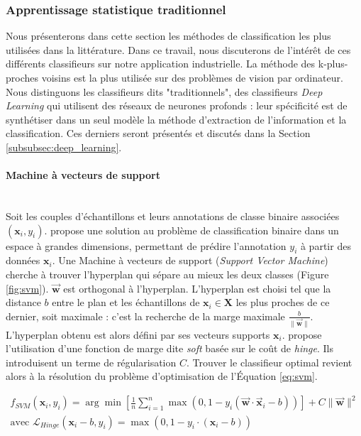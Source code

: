 \subsubsection{Apprentissage statistique traditionnel}
Nous présenterons dans cette section les méthodes de classification les plus utilisées dans la littérature.
Dans ce travail, nous discuterons de l'intérêt de ces différents classifieurs sur notre application industrielle.
La méthode des k-plus-proches voisins est la plus utilisée sur des problèmes de vision par ordinateur.
Nous distinguons les classifieurs dits "traditionnels", des classifieurs \textit{Deep Learning} qui utilisent des réseaux de neurones profonds : leur spécificité est de synthétiser dans un seul modèle la méthode d'extraction de l'information et la classification.
Ces derniers seront présentés et discutés dans la Section \ref{subsubsec:deep_learning}.

\paragraph{Machine à vecteurs de support}\mbox{\label{parag:svm}} \\
Soit les couples d'échantillons et leurs annotations de classe binaire associées $(\mathbf{x}_i, y_i)$.
\cite{vapnik_patterns_1963} propose une solution au problème de classification binaire dans un espace à grandes dimensions, permettant de prédire l'annotation $y_i$ à partir des données $\mathbf{x}_i$.
Une Machine à vecteurs de support (\textit{Support Vector Machine}) cherche à trouver l'hyperplan qui sépare au mieux les deux classes (Figure \ref{fig:svm}). $\vec{\mathbf{w}}$  est orthogonal à l'hyperplan.
L'hyperplan est choisi tel que la distance $b$ entre le plan et les échantillons de $\mathbf{x}_i \in \mathbf{X}$ les plus proches de ce dernier, soit maximale : c'est la recherche de la marge maximale $\frac{b}{\|\vec{\mathbf{w}}\|}$.
L'hyperplan obtenu est alors défini par ses vecteurs supports $\mathbf{x}_i$.
\cite{cortes_supportvector_1995, vapnik_support_1997} propose l'utilisation d'une fonction de marge dite \textit{soft} basée sur le coût de \textit{hinge}.
Ils introduisent un terme de régularisation $C$. Trouver le classifieur optimal revient alors à la résolution du problème d'optimisation de l'Équation \ref{eq:svm}.

\begin{equation} \label{eq:svm}
\begin{split}
f_{SVM}(\mathbf{x}_i, y_i) = \arg \min \left[\frac{1}{n} \sum_{i=1}^{n} \max \left(0, 1-y_{i}\left(\vec{\mathbf{w}} \cdot \vec{\mathbf{x}}_{i}-b\right)\right)\right]+ C \|\vec{\mathbf{w}}\|^{2}
\\
\text{avec } \mathcal{L}_{Hinge}(\mathbf{x}_i-b, y_i) = \max (0, 1 - y_i \cdot (\mathbf{x}_i-b))
\end{split}
\end{equation}

